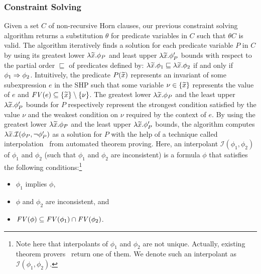 \vspace{-2pt}
\subsubsection{Constraint Solving}
\label{sec:cs}

Given a set \(C\) of non-recursive Horn clauses, our previous constraint
solving algorithm returns a substitution \(\theta\) for predicate
variables in \(C\) such that \(\theta C\) is valid.
The algorithm iteratively finds a solution for each predicate variable
\(P\) in \(C\) by using its greatest lower \(\lambda \widetilde{x}.\phi_{P}\)
and least upper \(\lambda \widetilde{x}.\phi_{P}'\) bounds with respect to the
partial order \(\sqsubseteq\) of predicates defined by: \(\lambda
\widetilde{x}.\phi_1 \sqsubseteq \lambda \widetilde{x}.\phi_2\) if and only if
\(\phi_1 \Rightarrow \phi_2\).
%
Intuitively, the predicate \(P(\widetilde{x})\) represents an invariant of
some subexpression \(e\) in the SHP such that some variable \(\nu \in
\{{\widetilde{x}}\}\) represents the value of \(e\) and \(\mathit{FV}({e}) \subseteq
\{{\widetilde{x}}\} \setminus \{{\nu}\}\).  The greatest lower \(\lambda
\widetilde{x}.\phi_P\) and the least upper \(\lambda \widetilde{x}.\phi_{P}'\)
bounds for \(P\) respectively represent the strongest condition
satisfied by the value \(\nu\) and the weakest condition on \(\nu\)
required by the context of \(e\).
%
By using the greatest lower \(\lambda \widetilde{x}.\phi_{P}\) and the least
upper \(\lambda \widetilde{x}.\phi_{P}'\) bounds, the algorithm computes
\(\lambda \widetilde{x}.\mathcal{I}(\phi_P,\neg \phi_P')\) as a solution for
\(P\) with the help of a technique called
interpolation~\cite{Henzinger2004,McMillan2005} from automated theorem
proving.  Here, an interpolant \(\mathcal{I}(\phi_1,\phi_2)\) of
\(\phi_1\) and \(\phi_2\) (such that \(\phi_1\) and \(\phi_2\) are
inconsistent) is a formula \(\phi\) that satisfies the following
conditions:\footnote{Note here that interpolants of \(\phi_1\) and
\(\phi_2\) are not unique.  Actually, existing theorem
provers~\cite{Henzinger2004,McMillan2005,Beyer2008} return one of them.
We denote such an interpolant as \(\mathcal{I}(\phi_1,\phi_2)\).}
\vspace{-4pt}
\begin{itemize}
\item \(\phi_1\) implies \(\phi\),
\item \(\phi\) and \(\phi_2\) are inconsistent, and
\item \(\mathit{FV}({\phi}) \subseteq \mathit{FV}({\phi_1}) \cap \mathit{FV}({\phi_2})\).
\end{itemize}
